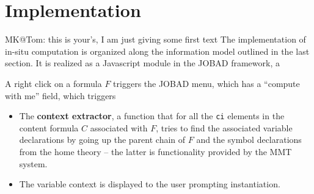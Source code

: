 \section{Implementation}\label{sec:impl}
\begin{newpart}{MK@Tom: this is your's, I am just giving some first text}
  The implementation of in-situ computation is organized along the information model
  outlined in the last section. It is realized as a Javascript module in the JOBAD
  framework, a 
  

  A right click on a formula $F$ triggers the JOBAD menu, which has a ``compute with me''
  field, which triggers
  \begin{itemize}
  \item The \textbf{context extractor}, a function that for all the \lstinline|ci|
    elements in the content formula $C$ associated with $F$, tries to find the associated
    variable declarations by going up the parent chain of $F$ and the symbol declarations
    from the home theory -- the latter is functionality provided by the MMT system.
  \item The variable context is displayed to the user prompting instantiation.
  \end{itemize}
\end{newpart}

